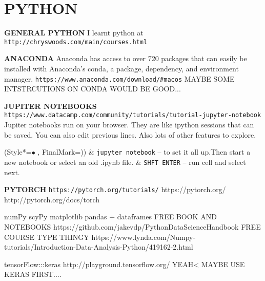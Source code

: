 \section{PYTHON}

\vspace{\baselineskip}
\textbf{GENERAL PYTHON}\newline
I learnt python at
\texttt{http://chryswoods.com/main/courses.html}

\vspace{\baselineskip}
\textbf{ANACONDA}\newline
Anaconda has access to over 720 packages that can easily be installed with Anaconda's conda, a package, dependency, and environment manager.\newline
\texttt{https://www.anaconda.com/download/\#macos}
MAYBE SOME INTSTRCUTIONS ON CONDA WOULD BE GOOD...

\vspace{\baselineskip}
\textbf{JUPITER NOTEBOOKS}\newline
\texttt{https://www.datacamp.com/community/tutorials/tutorial-jupyter-notebook} \newline
Jupiter notebooks run on your browser.
They are like ipython sessions that can be saved.
You can also edit previous lines.
Also lots of other features to explore.\newline
\begin{easylist}[itemize]
\ListProperties(Style*=$\bullet$ , FinalMark={)})
& \texttt{jupyter notebook} -- to set it all up.\newline Then start a new notebook or select an old .ipynb file.
& \texttt{SHFT ENTER} -- run cell and select next.
\end{easylist}

\vspace{\baselineskip}
\textbf{PYTORCH}\newline
\texttt{https://pytorch.org/tutorials/}
https://pytorch.org/
http://pytorch.org/docs/torch

\vspace{\baselineskip}
\vspace{\baselineskip}
\vspace{\baselineskip}
\vspace{\baselineskip}


numPy
scyPy
matplotlib
pandas + dataframes
FREE BOOK AND NOTEBOOKS
https://github.com/jakevdp/PythonDataScienceHandbook
FREE COURSE TYPE THINGY
https://www.lynda.com/Numpy-tutorials/Introduction-Data-Analysis-Python/419162-2.html


tensorFlow:::keras
http://playground.tensorflow.org/
YEAH< MAYBE USE KERAS FIRST....


\newpage